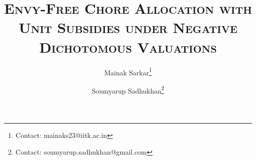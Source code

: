 \documentclass[11pt]{article}
\begin{document}
\makeatletter
\renewcommand\@makefnmark{\hbox{\@textsuperscript{\normalfont\@thefnmark}}}
\makeatother
\renewcommand{\thefootnote}{\fnsymbol{footnote}}



\title{\textsc{Envy-Free Chore Allocation with Unit Subsidies under Negative Dichotomous Valuations
}}

\author[1]{Mainak Sarkar\footnote{Contact: mainaks23@iitk.ac.in}}
\author[1]{Soumyarup Sadhukhan\footnote{Contact: soumyarup.sadhukhan@gmail.com}}

\date{}


\maketitle
\renewcommand{\thefootnote}{\arabic{footnote}}
\setcounter{footnote}{0}











\appendix


\end{document}
